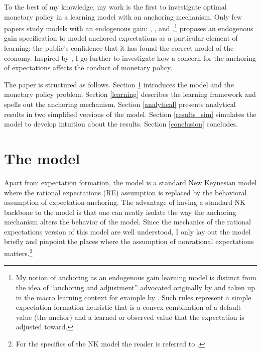 \documentclass[11pt]{article}
\renewcommand{\[}{\begin{equation}}
\renewcommand{\]}{\end{equation}}
\begin{document}
To the best of my knowledge, my work is the first to investigate optimal monetary policy in a learning model with an anchoring mechanism. Only few papers study models with an endogenous gain: \cite{marcet2003recurrent}, \cite{milani2014learning}, and \cite{carvalho2019anchored}.\footnote{My notion of anchoring as an endogenous gain learning model is distinct from the idea of ``anchoring and adjustment'' advocated originally by \cite{tversky1974judgment} and taken up in the macro learning context for example by \cite{anufriev2012evolutionary}. Such rules represent a simple expectation-formation heuristic that is a convex combination of a default value (the anchor) and a learned or observed value that the expectation is adjusted toward.} \cite{carvalho2019anchored} proposes an endogenous gain specification to model anchored expectations as a particular element of learning: the public's confidence that it has found the correct model of the economy. Inspired by \cite{carvalho2019anchored}, I go further to investigate how a concern for the anchoring of expectations affects the conduct of monetary policy.

The paper is structured as follows. Section \ref{NK} introduces the model and the monetary policy problem. Section \ref{learning} describes the learning framework and spells out the anchoring mechanism. Section \ref{analytical} presents analytical results in two simplified versions of the model. Section \ref{results_sim} simulates the model to develop intuition about the results. Section \ref{conclusion} concludes.

\section{The model}\label{NK}
Apart from expectation formation, the model is a standard New Keynesian model where the rational expectations (RE) assumption is replaced by the behavioral assumption of expectation-anchoring. The advantage of having a standard NK backbone to the model is that one can neatly isolate the way the anchoring mechanism alters the behavior of the model. Since the mechanics of the rational expectations version of this model are well understood, I only lay out the model briefly and pinpoint the places where the assumption of nonrational expectations matters.\footnote{For the specifics of the NK model the reader is referred to \cite{woodford2011interest}.}
\end{document}
